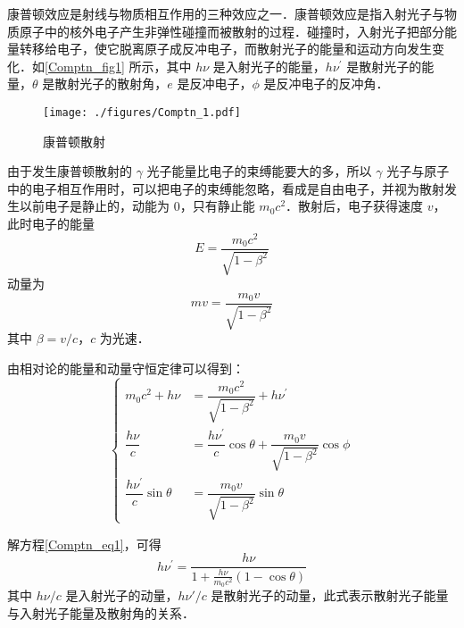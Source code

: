 
\begin{issues}
\issueMissDepend
\end{issues}

康普顿效应是射线与物质相互作用的三种效应之一．康普顿效应是指入射光子与物质原子中的核外电子产生非弹性碰撞而被散射的过程．碰撞时，入射光子把部分能量转移给电子，使它脱离原子成反冲电子，而散射光子的能量和运动方向发生变化．如\autoref{Comptn_fig1} 所示，其中 $h\nu$ 是入射光子的能量，$h\nu^\prime$ 是散射光子的能量，$\theta$ 是散射光子的散射角，$e$ 是反冲电子，$\phi$ 是反冲电子的反冲角．
\begin{figure}[ht]
\centering
\texttt{[image: ./figures/Comptn\_1.pdf]}
\caption{康普顿散射} \label{Comptn_fig1}
\end{figure}
由于发生康普顿散射的 $\gamma$ 光子能量比电子的束缚能要大的多，所以 $\gamma$ 光子与原子中的电子相互作用时，可以把电子的束缚能忽略，看成是自由电子，并视为散射发生以前电子是静止的，动能为 $0$，只有静止能 $m_0c^2$．散射后，电子获得速度 $v$，此时电子的能量
\begin{equation}
E=\frac{m_{0} c^{2}}{\sqrt{1-\beta^{2}}}
\end{equation}
动量为
\begin{equation}
m v=\frac{m_{0} v}{\sqrt{1-\beta^{2}}}
\end{equation}
其中 $\beta=v/c$，$c$ 为光速．

由相对论的能量和动量守恒定律可以得到：
\begin{equation} \label{Comptn_eq1}
\begin{cases}
m_{0} c^{2}+h \nu&=\dfrac{m_{0} c^{2}}{\sqrt{1-\beta^{2}}}+h \nu^{\prime} \\
\dfrac{h \nu}{c}&=\dfrac{h \nu^{\prime}}{c} \cos \theta+\dfrac{m_{0} v}{\sqrt{1-\beta^{2}}} \cos \phi \\
\dfrac{h \nu^{\prime}}{c} \sin \theta&=\dfrac{m_{0} v}{\sqrt{1-\beta^{2}}} \sin \theta
\end{cases}
\end{equation}

解方程\autoref{Comptn_eq1}，可得
\begin{equation}
h \nu^{\prime}=\frac{h \nu}{1+\frac{h \nu}{m_{0} c^{2}}(1-\cos \theta)}
\end{equation}
其中 $h\nu / c$ 是入射光子的动量，$h\nu' / c$ 是散射光子的动量，此式表示散射光子能量与入射光子能量及散射角的关系．